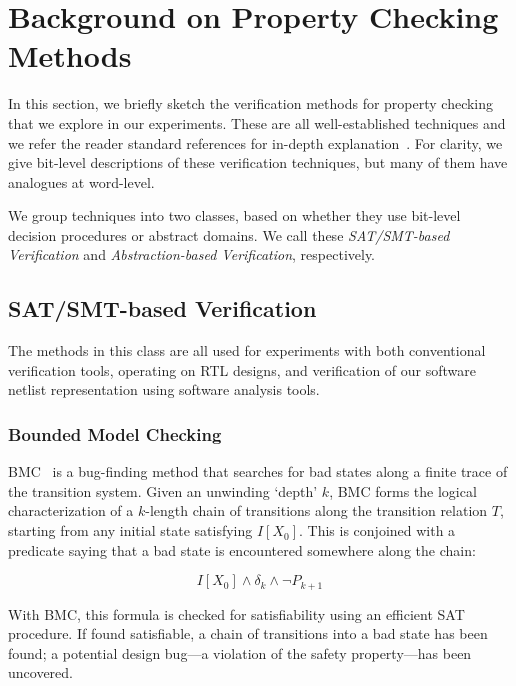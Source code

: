 \section{Background on Property Checking Methods}\label{sec:background}

In this section, we briefly sketch the verification methods for property checking that
we explore in our experiments. These are all well-established techniques and we refer 
the reader standard references for in-depth explanation~\cite{mc,hbmc}.
For clarity, we give bit-level descriptions of these verification techniques, but
many of them have analogues at word-level.

We group techniques into two classes, based on whether they use bit-level decision procedures 
or abstract domains. We call these \textit{SAT/SMT-based Verification} and 
\textit{Abstraction-based Verification}, respectively.

\subsection{SAT/SMT-based Verification}

The methods in this class are all used for experiments with both conventional verification tools,
operating on RTL designs, and verification of  our software netlist representation using software analysis tools.

\subsubsection{Bounded Model Checking} 

BMC~\cite{biere} is a bug-finding method that searches for bad states along a finite trace of 
the transition system. 
Given an unwinding `depth' $k$, BMC forms the logical characterization of a 
$k$-length chain of transitions along the transition relation $T$,  starting 
from any initial state satisfying $I[X_0]$. This is conjoined with a predicate saying that a bad state is encountered somewhere along the chain:

\begin{equation}\label{bmc-formula}
I[X_0] \wedge \delta_k \wedge \neg P_{k+1}
\end{equation}

With BMC, this formula is checked for satisfiability using an efficient SAT procedure.
If found satisfiable, a chain of transitions into a bad state has been found;
a potential design bug---a violation of the safety property---has been uncovered.

